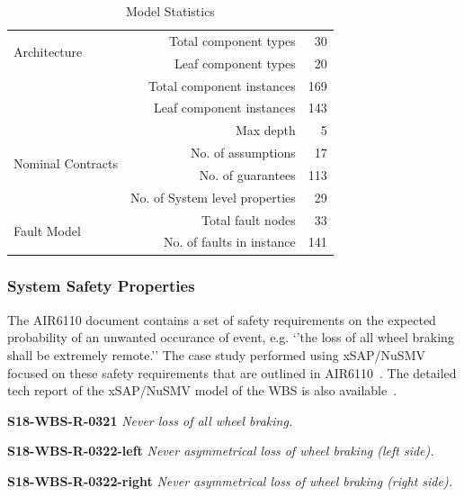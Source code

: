 \begin{table}[h!]
  \begin{center}
    \begin{tabular}{l|r|r} %
      \hline
      \multirow{2}{*}{Architecture} & Total component types & 30\\ %
      & Leaf component types & 20\\ 
      & Total component instances & 169\\ 
      & Leaf component instances & 143\\ 
      & Max depth & 5\\ 
      \hline
      \multirow{2}{*}{Nominal Contracts} & No. of assumptions & 17\\ %
      & No. of guarantees & 113\\ 
      & No. of System level properties & 29\\ 
      \hline
      \multirow{2}{*}{Fault Model} & Total fault nodes & 33\\ %
      & No. of faults in instance & 141\\ 
      \hline
    \end{tabular}
    \vspace{1em}
    \caption{Model Statistics}
    \label{tab:model_stats}
  \end{center}
\end{table}

\subsubsection{System Safety Properties}
The AIR6110 document contains a set of safety requirements on the expected probability of an unwanted occurance of event, e.g. `'the loss of all wheel braking shall be extremely remote.'' The case study performed using xSAP/NuSMV focused on these safety requirements that are outlined in AIR6110~\cite{mattareiThesis, DBLP:conf/cav/BozzanoCPJKPRT15}. The detailed tech report of the xSAP/NuSMV model of the WBS is also available~\cite{air6110TechReport}.

\textbf{S18-WBS-R-0321} \textit{Never loss of all wheel braking.}

\textbf{S18-WBS-R-0322-left} \textit{Never asymmetrical loss of wheel braking (left side).}

\textbf{S18-WBS-R-0322-right} \textit{Never asymmetrical loss of wheel braking (right side).}


